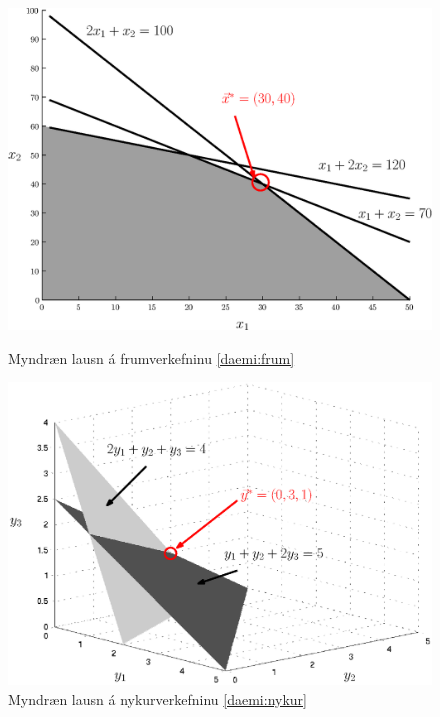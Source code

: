 \begin{figure}[t!]
\centering
 \includegraphics[width=0.85\columnwidth]{figs/wyndor_frumlausn.eps}
 \caption{Myndræn lausn á frumverkefninu \ref{daemi:frum}} 
 \includegraphics[width=0.85\columnwidth]{figs/wyndor_nykurlausn.eps}
 \caption{Myndræn lausn á nykurverkefninu \ref{daemi:nykur}} 
\end{figure}

